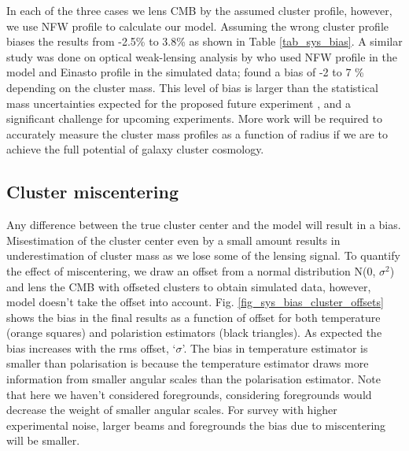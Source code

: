  In each of the three cases we lens CMB by the assumed cluster profile, however, we use NFW profile to calculate our model.
 Assuming the wrong cluster profile biases the results from -2.5\% to 3.8\% as shown in Table \ref{tab_sys_bias}. 
 A similar study was done on optical weak-lensing analysis by \citet{sereno16} who used NFW profile in the model and Einasto profile in the simulated data; \citet{sereno16} found a bias of -2 to 7 \% depending on the cluster mass. This level of bias is larger than the statistical mass uncertainties expected for the proposed future experiment \citep{cmbs4-sb1}, and a significant challenge for upcoming experiments.
More work will be required to accurately measure the cluster mass profiles as a function of radius if we are to achieve the full potential of galaxy cluster cosmology. 

\subsection{Cluster miscentering}

Any difference between the true cluster center and the model will result in a bias.
 Misestimation of the cluster center even by a small amount results in underestimation of cluster mass as we lose some of the lensing signal.
To quantify the effect of miscentering, we draw an offset from a normal distribution N(0, $\sigma^{2}$) and lens the CMB with offseted clusters to obtain simulated data, however, model doesn't take the offset into account.
Fig. \ref{fig_sys_bias_cluster_offsets} shows the bias in the final results as a function of offset for both temperature (orange squares) and polaristion estimators (black triangles).
As expected the bias increases with the rms offset, `$\sigma$'.
The bias in temperature estimator is smaller than polarisation is because the temperature estimator draws more information from smaller angular scales than the polarisation estimator. Note that here we haven't considered foregrounds, considering foregrounds would decrease the weight of smaller angular scales. For survey with higher experimental noise, larger beams and foregrounds the bias due to miscentering will be smaller.

